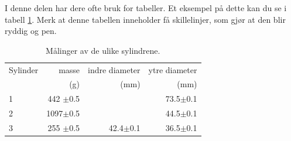 \documentclass[5p]{elsarticle}
\newcommand{\enhet}[1]{~\mathrm{#1}}  %
\begin{document}

I denne delen har dere ofte bruk for tabeller. Et eksempel på dette kan du se i tabell \ref{MinLilleTabell}. 
Merk at denne tabellen inneholder få skillelinjer, som gjør at den blir ryddig og pen.
\begin{table}[htb]
	\begin{center}
		\caption{Målinger av de ulike sylindrene.}
		\label{MinLilleTabell}	%
		\begin{tabular}{lrrr} 		%
			\hline 								%
		    Sylinder &  masse  & indre diameter & ytre diameter \\ %
			&  (g)    &   (mm)   &  (mm)    \\ %
			\hline												
			1   &  442 \(\pm\)0.5 & 	  & 73.5\(\pm\)0.1 \\ %
			2   &  1097\(\pm\)0.5 & 	  & 44.5\(\pm\)0.1 \\ %
			3   &  255 \(\pm\)0.5 & 42.4\(\pm\)0.1 & 36.5\(\pm\)0.1 \\ %
			\hline
		\end{tabular}
	\end{center}
\end{table}
\end{document}
